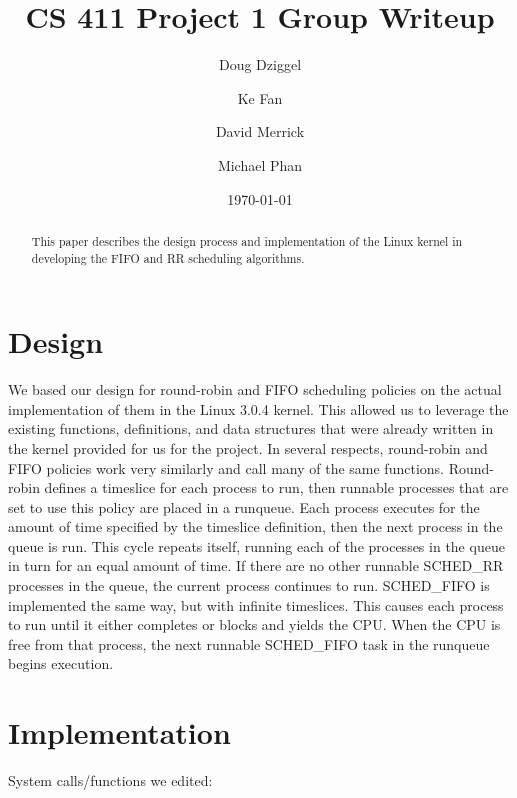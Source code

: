 \documentclass[letterpaper,10pt,titlepage]{article}
\begin{document}
\title{CS 411 Project 1 Group Writeup}
\author{Doug Dziggel \and Ke Fan \and David Merrick \and Michael Phan}
\date{\today}
\maketitle

\begin{abstract}
This paper describes the design process and implementation of the Linux kernel in developing the FIFO and RR scheduling algorithms.
\end{abstract}

\section{Design}

    We based our design for round-robin and FIFO scheduling policies on the actual implementation of them in the Linux 3.0.4 kernel. 
    This allowed us to leverage the existing functions, definitions, and data structures that were already written in the kernel 
    provided for us for the project. In several respects, round-robin and FIFO policies work very similarly and call many of the
    same functions. Round-robin defines a timeslice for each process to run, then runnable processes that are set to use this policy
    are placed in a runqueue. Each process executes for the amount of time specified by the timeslice definition, then the next process
    in the queue is run. This cycle repeats itself, running each of the processes in the queue in turn for an equal amount of time.
    If there are no other runnable SCHED\_RR processes in the queue, the current process continues to run. SCHED\_FIFO is implemented the
    same way, but with infinite timeslices. This causes each process to run until it either completes or blocks and yields the CPU. 
    When the CPU is free from that process, the next runnable SCHED\_FIFO task in the runqueue begins execution.

\section{Implementation}

System calls/functions we edited:\\
\end{document}
